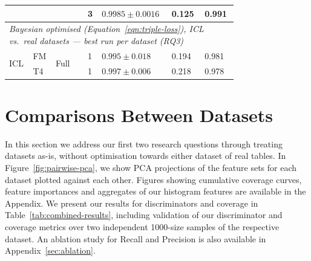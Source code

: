 \documentclass{article}
\begin{document}
\begin{table}[ht]
\begin{tabular}{p{0.05\linewidth} p{0.05\linewidth} p{0.13\linewidth} p{0.04\linewidth} p{0.22\linewidth} p{0.13\linewidth} p{0.13\linewidth}}
 &&& 3 & $0.9985 \pm 0.0016$ & 0.125 & 0.991 \\
\midrule
\multicolumn{7}{l}{\textit{Bayesian optimised (Equation~\ref{eqn:triple-loss}), ICL vs.\ real datasets --- best run per dataset (RQ3)}} \\
\midrule
\multirow{2}{*}{ICL} & FM & \multirow{2}{*}{Full} & 1 & $0.995 \pm 0.018$ & 0.194 & 0.981 \\
 & T4 && 1 & $0.997 \pm 0.006$ & 0.218 & 0.978 \\
\bottomrule
\end{tabular}

\end{table}




\section{Comparisons Between Datasets}
\label{sec:comparision}




In this section we address our first two research questions through treating datasets as-is, without optimisation towards either dataset of real tables.
In Figure~\ref{fig:pairwise-pca}, we show PCA projections of the feature sets for each dataset plotted against each other.
Figures showing cumulative coverage curves, feature importances and aggregates of our histogram features are available in the Appendix.
We present our results for discriminators and coverage in Table~\ref{tab:combined-results}, including validation of our discriminator and coverage metrics over two independent 1000-size samples of the respective dataset.
An ablation study for Recall and Precision is also available in Appendix~\ref{sec:ablation}.



\end{document}
